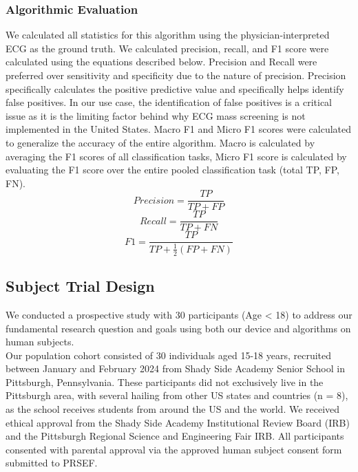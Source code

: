\documentclass[
	a4paper, 
	10pt, 
	twoside, 
]{LTJournalArticle}
\begin{document}
\subsubsection{Algorithmic Evaluation}
We calculated all statistics for this algorithm using the physician-interpreted ECG as the ground truth. We calculated precision, recall, and F1 score were calculated using the equations described below. Precision and Recall were preferred over sensitivity and specificity due to the nature of precision. Precision specifically calculates the positive predictive value and specifically helps identify false positives. In our use case, the identification of false positives is a critical issue as it is the limiting factor behind why ECG mass screening is not implemented in the United States. Macro F1 and Micro F1 scores were calculated to generalize the accuracy of the entire algorithm. Macro is calculated by averaging the F1 scores of all classification tasks, Micro F1 score is calculated by evaluating the F1 score over the entire pooled classification task (total TP, FP, FN). 
\begin{equation}
    Precision = \frac{TP}{TP+FP}
\end{equation}
\begin{equation}
    Recall = \frac{TP}{TP+FN}
\end{equation}
\begin{equation}
    F1 = \frac{TP}{TP+\frac{1}{2}(FP+FN)}
\end{equation}
\subsection{Subject Trial Design}
We conducted a prospective study with 30 participants (Age < 18) to address our fundamental research question and goals using both our device and algorithms on human subjects.
\\
Our population cohort consisted of 30 individuals aged 15-18 years, recruited between January and February 2024 from Shady Side Academy Senior School in Pittsburgh, Pennsylvania. These participants did not exclusively live in the Pittsburgh area, with several hailing from other US states and countries (n = 8), as the school receives students from around the US and the world. We received ethical approval from the Shady Side Academy Institutional Review Board (IRB) and the Pittsburgh Regional Science and Engineering Fair IRB. All participants consented with parental approval via the approved human subject consent form submitted to PRSEF. 
\end{document}
